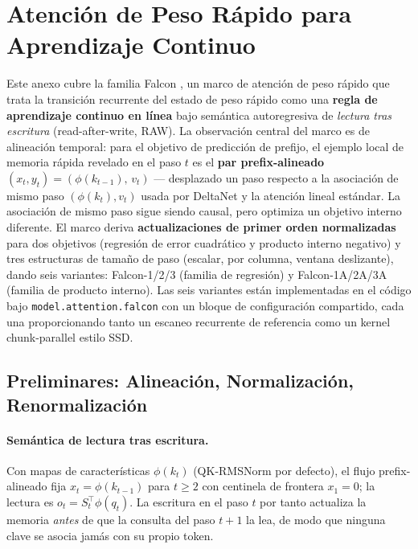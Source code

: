 \section{Atención de Peso Rápido para Aprendizaje Continuo}
\label{sec:annex-fast-weight}

Este anexo cubre la familia Falcon \citep{zhang_falcon_2026}, un marco de atención de peso rápido que trata la transición recurrente del estado de peso rápido como una \textbf{regla de aprendizaje continuo en línea} bajo semántica autoregresiva de \emph{lectura tras escritura} (read-after-write, RAW). La observación central del marco es de alineación temporal: para el objetivo de predicción de prefijo, el ejemplo local de memoria rápida revelado en el paso $t$ es el \textbf{par prefix-alineado} $(x_t, y_t) = (\phi(k_{t-1}),\, v_t)$ --- desplazado un paso respecto a la asociación de mismo paso $(\phi(k_t), v_t)$ usada por DeltaNet y la atención lineal estándar. La asociación de mismo paso sigue siendo causal, pero optimiza un objetivo interno diferente. El marco deriva \textbf{actualizaciones de primer orden normalizadas} para dos objetivos (regresión de error cuadrático y producto interno negativo) y tres estructuras de tamaño de paso (escalar, por columna, ventana deslizante), dando seis variantes: Falcon-1/2/3 (familia de regresión) y Falcon-1A/2A/3A (familia de producto interno). Las seis variantes están implementadas en el código bajo \texttt{model.attention.falcon} con un bloque de configuración compartido, cada una proporcionando tanto un escaneo recurrente de referencia como un kernel chunk-parallel estilo SSD.

\subsection{Preliminares: Alineación, Normalización, Renormalización}

\paragraph{Semántica de lectura tras escritura.} Con mapas de características $\phi(k_t)$ (QK-RMSNorm por defecto), el flujo prefix-alineado fija $x_t = \phi(k_{t-1})$ para $t \ge 2$ con centinela de frontera $x_1 = 0$; la lectura es $o_t = S_t^\top \phi(q_t)$. La escritura en el paso $t$ por tanto actualiza la memoria \emph{antes} de que la consulta del paso $t+1$ la lea, de modo que ninguna clave se asocia jamás con su propio token.

